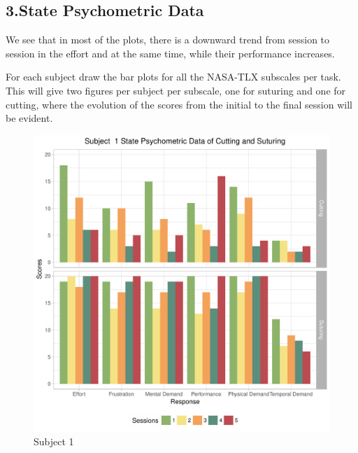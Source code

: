 \documentclass[12pt,epsf]{report}
\begin{document}
{\subsection*{3.State Psychometric Data}
We see that in most of the plots, there is a downward trend from session to session in the effort and at the same time, while their performance increases.
For each subject draw the bar plots for all the NASA-TLX subscales per task. This will give two figures per subject per subscale, one for suturing and one for cutting, where the evolution of the scores from the initial to the final session will be evident. \\
\begin{figure}[!htb]
	\begin{minipage}[c]{0.5\linewidth}
	\includegraphics[width=\linewidth]{subject01_State_Psychometric_Data_of_Cutting_and_Suturing.pdf}
	\caption{Subject 1 }
	\end{minipage}
	\hfill
	\begin{minipage}[c]{0.5\linewidth}

\end{minipage}
\end{figure}}
\end{document}
